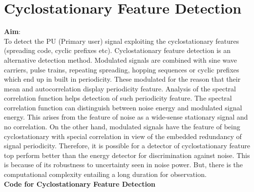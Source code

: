 \documentclass[a4paper]{article}
\begin{document}
\newpage
\section{Cyclostationary Feature Detection}
\textbf{\large{Aim}}:\\[10pt]
To detect the PU (Primary user) signal exploiting the cyclostationary features
(spreading code, cyclic prefixes etc). Cyclostationary feature detection is
an alternative detection method. Modulated signals are combined with sine
wave carriers, pulse trains, repeating spreading, hopping sequences or cyclic
prefixes which end up in built in periodicity. These modulated for the reason
that their mean and autocorrelation display periodicity feature. Analysis of
the spectral correlation function helps detection of such periodicity feature.
The spectral correlation function can distinguish between noise energy and
modulated signal energy. This arises from the feature of noise as a wide-sense
stationary signal and no correlation. On the other hand, modulated signals
have the feature of being cyclostationary with special correlation in view of
the embedded redundancy of signal periodicity. Therefore, it is possible for a
detector of cyclostationary feature top perform better than the energy detector
for discrimination against noise. This is because of its robustness to uncertainty
seen in noise power. But, there is the computational complexity entailing a
long duration for observation.\\[10pt]
\textbf{Code for Cyclostationary Feature Detection}\\
\end{document}
